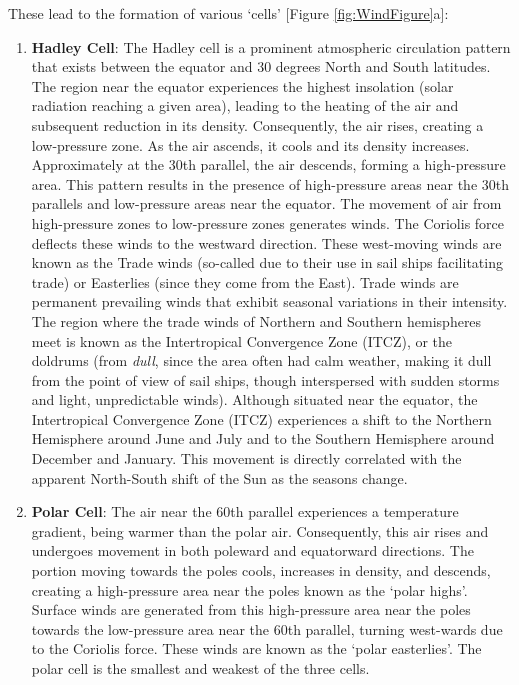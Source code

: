 \documentclass[
  12 pt,
]{Nemilov}
\begin{document}
These lead to the formation of various `cells' {[}Figure \ref{fig:WindFigure}a{]}:

\begin{enumerate}
\def\labelenumi{\arabic{enumi}.}
\item
  \textbf{Hadley Cell}: The Hadley cell is a prominent atmospheric circulation pattern that exists between the equator and 30 degrees North and South latitudes. The region near the equator experiences the highest insolation (solar radiation reaching a given area), leading to the heating of the air and subsequent reduction in its density. Consequently, the air rises, creating a low-pressure zone. As the air ascends, it cools and its density increases. Approximately at the 30th parallel, the air descends, forming a high-pressure area. This pattern results in the presence of high-pressure areas near the 30th parallels and low-pressure areas near the equator. The movement of air from high-pressure zones to low-pressure zones generates winds. The Coriolis force deflects these winds to the westward direction. These west-moving winds are known as the Trade winds (so-called due to their use in sail ships facilitating trade) or Easterlies (since they come from the East). Trade winds are permanent prevailing winds that exhibit seasonal variations in their intensity. The region where the trade winds of Northern and Southern hemispheres meet is known as the Intertropical Convergence Zone (ITCZ), or the doldrums (from \textit{dull}, since the area often had calm weather, making it dull from the point of view of sail ships, though interspersed with sudden storms and light, unpredictable winds). Although situated near the equator, the Intertropical Convergence Zone (ITCZ) experiences a shift to the Northern Hemisphere around June and July and to the Southern Hemisphere around December and January. This movement is directly correlated with the apparent North-South shift of the Sun as the seasons change.
\item
  \textbf{Polar Cell}: The air near the 60th parallel experiences a temperature gradient, being warmer than the polar air. Consequently, this air rises and undergoes movement in both poleward and equatorward directions. The portion moving towards the poles cools, increases in density, and descends, creating a high-pressure area near the poles known as the `polar highs'. Surface winds are generated from this high-pressure area near the poles towards the low-pressure area near the 60th parallel, turning west-wards due to the Coriolis force. These winds are known as the `polar easterlies'. The polar cell is the smallest and weakest of the three cells.

\end{enumerate}
\end{document}

